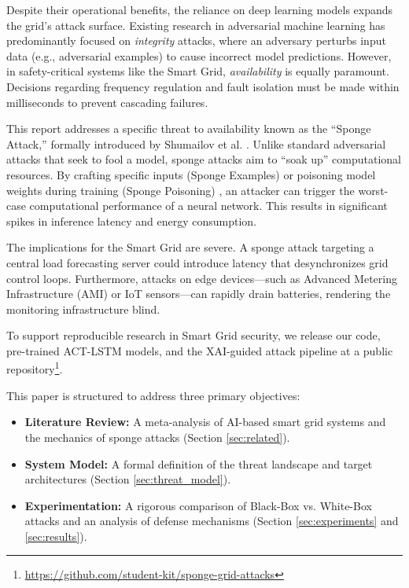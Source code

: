 \documentclass[conference]{IEEEtran}
\begin{document}
Despite their operational benefits, the reliance on deep learning models expands the grid's attack surface. Existing research in adversarial machine learning has predominantly focused on \textit{integrity} attacks, where an adversary perturbs input data (e.g., adversarial examples) to cause incorrect model predictions. However, in safety-critical systems like the Smart Grid, \textit{availability} is equally paramount. Decisions regarding frequency regulation and fault isolation must be made within milliseconds to prevent cascading failures.

This report addresses a specific threat to availability known as the ``Sponge Attack,'' formally introduced by Shumailov et al. \cite{shumailov2021sponge}. Unlike standard adversarial attacks that seek to fool a model, sponge attacks aim to ``soak up'' computational resources. By crafting specific inputs (Sponge Examples) \cite{cina2022sponge} or poisoning model weights during training (Sponge Poisoning) \cite{cina2022sponge}, an attacker can trigger the worst-case computational performance of a neural network. This results in significant spikes in inference latency and energy consumption.

The implications for the Smart Grid are severe. A sponge attack targeting a central load forecasting server could introduce latency that desynchronizes grid control loops. Furthermore, attacks on edge devices—such as Advanced Metering Infrastructure (AMI) or IoT sensors—can rapidly drain batteries, rendering the monitoring infrastructure blind.

To support reproducible research in Smart Grid security, we release our code, pre-trained ACT-LSTM models, and the XAI-guided attack pipeline at a public repository\footnote{\url{https://github.com/student-kit/sponge-grid-attacks}}.

This paper is structured to address three primary objectives:
\begin{itemize}
    \item \textbf{Literature Review:} A meta-analysis of AI-based smart grid systems and the mechanics of sponge attacks (Section \ref{sec:related}).
    \item \textbf{System Model:} A formal definition of the threat landscape and target architectures (Section \ref{sec:threat_model}).
    \item \textbf{Experimentation:} A rigorous comparison of Black-Box vs. White-Box attacks and an analysis of defense mechanisms (Section \ref{sec:experiments} and \ref{sec:results}).
\end{itemize}
\end{document}
